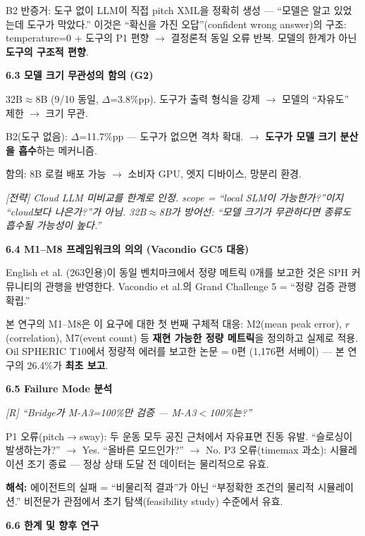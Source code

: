 \documentclass[12pt,a4paper]{article}
\begin{document}
B2 반증거: 도구 없이 LLM이 직접 pitch XML을 정확히 생성 ---
``모델은 알고 있었는데 도구가 막았다.''
이것은 ``확신을 가진 오답''(confident wrong answer)의 구조:
temperature=0 + 도구의 P1 편향 $\rightarrow$ 결정론적 동일 오류 반복.
모델의 한계가 아닌 \textbf{도구의 구조적 편향}.

\textbf{6.3 모델 크기 무관성의 함의 (G2)}

32B$\approx$8B (9/10 동일, $\Delta$=3.8\%pp).
도구가 출력 형식을 강제 $\rightarrow$ 모델의 ``자유도'' 제한 $\rightarrow$ 크기 무관.

B2(도구 없음): $\Delta$=11.7\%pp --- 도구가 없으면 격차 확대.
$\rightarrow$ \textbf{도구가 모델 크기 분산을 흡수}하는 메커니즘.

함의: 8B 로컬 배포 가능 $\rightarrow$ 소비자 GPU, 엣지 디바이스, 망분리 환경.

{\color{strategy}\textit{[전략] Cloud LLM 미비교를 한계로 인정.
scope = ``local SLM이 가능한가?''이지 ``cloud보다 나은가?''가 아님.
32B$\approx$8B가 방어선: ``모델 크기가 무관하다면 종류도 흡수될 가능성이 높다.''}}

\textbf{6.4 M1--M8 프레임워크의 의의 (Vacondio GC5 대응)}

English et al. (263인용)이 동일 벤치마크에서 정량 메트릭 0개를 보고한 것은
SPH 커뮤니티의 관행을 반영한다.
Vacondio et al.의 Grand Challenge 5 = ``정량 검증 관행 확립.''

본 연구의 M1--M8은 이 요구에 대한 첫 번째 구체적 대응:
M2(mean peak error), $r$(correlation), M7(event count) 등
\textbf{재현 가능한 정량 메트릭}을 정의하고 실제로 적용.
Oil SPHERIC T10에서 정량적 에러를 보고한 논문 = 0편 (1,176편 서베이) ---
본 연구의 26.4\%가 \textbf{최초 보고}.

\textbf{6.5 Failure Mode 분석}

{\color{reviewer}\textit{[R] ``Bridge가 M-A3=100\%만 검증 --- M-A3$<$100\%는?''}}

P1 오류(pitch$\rightarrow$sway): 두 운동 모두 공진 근처에서 자유표면 진동 유발.
``슬로싱이 발생하는가?'' $\rightarrow$ Yes.
``올바른 모드인가?'' $\rightarrow$ No.
P3 오류(timemax 과소): 시뮬레이션 조기 종료 --- 정상 상태 도달 전 데이터는 물리적으로 유효.

\textbf{해석:} 에이전트의 실패 = ``비물리적 결과''가 아닌 ``부정확한 조건의 물리적 시뮬레이션.''
비전문가 관점에서 초기 탐색(feasibility study) 수준에서 유효.

\textbf{6.6 한계 및 향후 연구}
\end{document}
